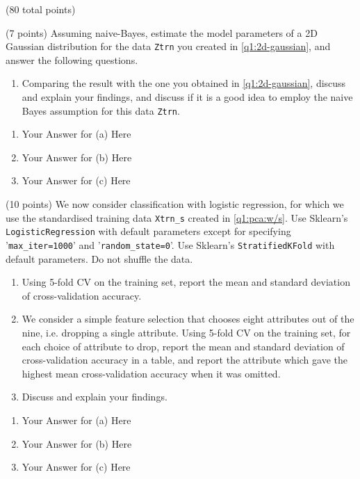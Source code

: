 \documentclass[12pt]{article}
\begin{document}
\begin{question}{(80 total points) \qOneTitle}
\begin{subquestion}{(7 points)
    Assuming naive-Bayes, estimate the model parameters of a 2D Gaussian distribution for the data {\tt Ztrn} you created in \ref{q1:2d-gaussian}, and answer the following questions.
  }
\begin{enumerate}
  \item Comparing the result with the one you obtained in \ref{q1:2d-gaussian}, discuss and explain your findings, and discuss if it is a good idea to employ the naive Bayes assumption for this data {\tt Ztrn}.
  \end{enumerate}
   

  \begin{answerbox}{0.75\textheight}
    \begin{enumerate}
    \item Your Answer for (a) Here
    \item Your Answer for (b) Here
    \item Your Answer for (c) Here
    \end{enumerate}
  \end{answerbox}
  


\end{subquestion}


\begin{subquestion}{(10 points)
    We now consider classification with logistic regression, for which we use the standardised training data {\tt Xtrn\_s} created in \ref{q1:pca:w/s}.
    Use Sklearn's {\tt LogisticRegression} with default parameters except for specifying '{\tt max\_iter=1000}' and '{\tt random\_state=0}'.
    Use Sklearn's {\tt StratifiedKFold} with default parameters. Do not shuffle the data.
  } 
  \begin{enumerate}\NARROWITEM
  \item Using 5-fold CV on the training set, report the mean and standard deviation of cross-validation accuracy.
  \item We consider a simple feature selection that chooses eight attributes out of the nine, i.e. dropping a single attribute. Using 5-fold CV on the training set, for each choice of attribute to drop, report the mean and standard deviation of cross-validation accuracy in a table, and report the attribute which gave the highest mean cross-validation accuracy when it was omitted.
  \item Discuss and explain your findings.
  \end{enumerate}
   

  \begin{answerbox}{0.5\textheight}
    \begin{enumerate}
    \item Your Answer for (a) Here
    \item Your Answer for (b) Here
    \item Your Answer for (c) Here
    \end{enumerate}
  \end{answerbox}
  


\end{subquestion}

\end{question}
\end{document}
